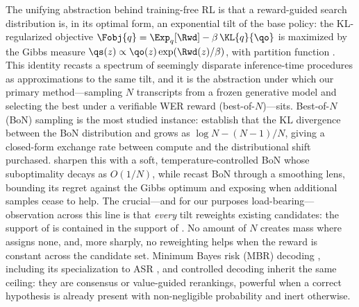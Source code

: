 The unifying abstraction behind training-free RL is that a reward-guided search distribution \qz is, in its optimal form, an exponential tilt of the base policy: the KL-regularized objective \(\Fobj{q}=\Exp_{q}[\Rwd]-\beta\,\KL{q}{\qo}\) is maximized by the Gibbs measure \(\qs(z)\propto\qo(z)\exp(\Rwd(z)/\beta)\), with partition function \Zpart \citep{korbak2022kl}. This identity recasts a spectrum of seemingly disparate inference-time procedures as approximations to the same tilt, and it is the abstraction under which our primary method---sampling $N$ transcripts from a frozen generative model and selecting the best under a verifiable WER reward (best-of-$N$)---sits. Best-of-$N$ (BoN) sampling is the most studied instance: \citet{beirami2024bon} establish that the KL divergence between the BoN distribution and \qo grows as \(\log N - (N{-}1)/N\), giving a closed-form exchange rate between compute and the distributional shift purchased. \citet{verdun2025softbon} sharpen this with a soft, temperature-controlled BoN whose suboptimality decays as \(O(1/N)\), while \citet{aminian2025smoothing} recast BoN through a smoothing lens, bounding its regret against the Gibbs optimum and exposing when additional samples cease to help. The crucial---and for our purposes load-bearing---observation across this line is that \emph{every} tilt reweights existing candidates: the support of \qz is contained in the support of \qo. No amount of $N$ creates mass where \qo assigns none, and, more sharply, no reweighting helps when the reward is constant across the candidate set. Minimum Bayes risk (MBR) decoding \citep{ichihara2025mbr}, including its specialization to ASR \citep{mbrasr2025}, and controlled decoding \citep{mudgal2024controlled} inherit the same ceiling: they are consensus or value-guided rerankings, powerful when a correct hypothesis is already present with non-negligible probability and inert otherwise.

